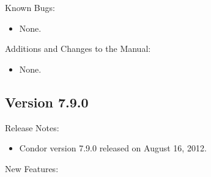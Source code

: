 \noindent Known Bugs:

\begin{itemize}

\item None.

\end{itemize}

\noindent Additions and Changes to the Manual:

\begin{itemize}

\item None.

\end{itemize}


\subsection*{\label{sec:New-7-9-0}Version 7.9.0}

\noindent Release Notes:

\begin{itemize}

\item Condor version 7.9.0 released on August 16, 2012.

\end{itemize}


\noindent New Features:


